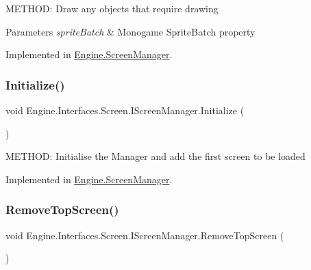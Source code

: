 M\+E\+T\+H\+OD\+: Draw any objects that require drawing 


\begin{DoxyParams}{Parameters}
{\em sprite\+Batch} & Monogame Sprite\+Batch property\\
\hline
\end{DoxyParams}


Implemented in \hyperlink{a00538_a1177fbd3eb0a300167e4fa99930025e1}{Engine.\+Screen\+Manager}.

\mbox{\label{a00470_ae37c13c038cdb202262013731985eb10}} 
\subsubsection{\texorpdfstring{Initialize()}{Initialize()}}
{\footnotesize\ttfamily void Engine.\+Interfaces.\+Screen.\+I\+Screen\+Manager.\+Initialize (\begin{DoxyParamCaption}{ }\end{DoxyParamCaption})}



M\+E\+T\+H\+OD\+: Initialise the Manager and add the first screen to be loaded 



Implemented in \hyperlink{a00538_aaa2b6fe0b50cf126bbb0a9b39fac1b83}{Engine.\+Screen\+Manager}.

\mbox{\label{a00470_a91b5204271edf5e137a85d3f8f3876d8}} 
\subsubsection{\texorpdfstring{Remove\+Top\+Screen()}{RemoveTopScreen()}}
{\footnotesize\ttfamily void Engine.\+Interfaces.\+Screen.\+I\+Screen\+Manager.\+Remove\+Top\+Screen (\begin{DoxyParamCaption}{ }\end{DoxyParamCaption})}



